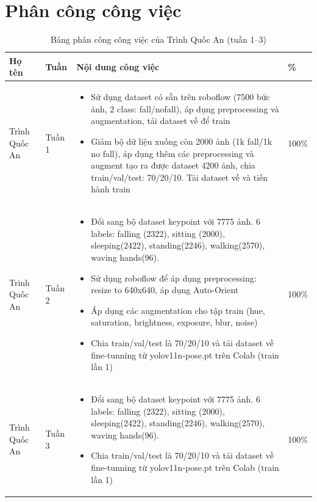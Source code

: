 \documentclass[12pt, a4paper]{article}
\begin{document}
\newpage
\appendix
\section{Phân công công việc}

\begin{table}[H]
  \centering
  \caption{Bảng phân công công việc của Trình Quốc An (tuần 1--3)}
  \label{tab:work_assignment_an_1}
  \renewcommand{\arraystretch}{1.2}
  \begin{tabularx}{\textwidth}{@{}p{3.6cm}p{1.4cm}X p{1.1cm}@{}}
    \toprule
    \textbf{Họ tên} & \textbf{Tuần} & \textbf{Nội dung công việc} & \textbf{\%} \\
    \midrule
    Trình Quốc An & Tuần 1 &
    \begin{itemize}[nosep, leftmargin=*]
      \item Sử dụng dataset có sẵn trên roboflow (7500 bức ảnh, 2 class: fall/nofall), áp dụng preprocessing và augmentation, tải dataset về để train
      \item Giảm bộ dữ liệu xuống còn 2000 ảnh (1k fall/1k no fall), áp dụng thêm các preprocessing và augment tạo ra được dataset 4200 ảnh, chia train/val/test: 70/20/10. Tải dataset về và tiến hành train
    \end{itemize}
    & 100\% \\
    \addlinespace
    Trình Quốc An & Tuần 2 &
    \begin{itemize}[nosep, leftmargin=*]
      \item Đổi sang bộ dataset keypoint với 7775 ảnh. 6 labels: falling (2322), sitting (2000), sleeping(2422), standing(2246), walking(2570), waving hands(96).
      \item Sử dụng roboflow để áp dụng preprocessing: resize to 640x640, áp dụng Auto-Orient
      \item Áp dụng các augmentation cho tập train (hue, saturation, brightness, exposure, blur, noise)
      \item Chia train/val/test là 70/20/10 và tải dataset về fine-tunning từ yolov11n-pose.pt trên Colab (train lần 1)
    \end{itemize}
    & 100\% \\
    \addlinespace
    Trình Quốc An & Tuần 3 &
    \begin{itemize}[nosep, leftmargin=*]
      \item Đổi sang bộ dataset keypoint với 7775 ảnh. 6 labels: falling (2322), sitting (2000), sleeping(2422), standing(2246), walking(2570), waving hands(96).
      \item Chia train/val/test là 70/20/10 và tải dataset về fine-tunning từ yolov11n-pose.pt trên Colab (train lần 1)
    \end{itemize}
    & 100\% \\
    \bottomrule
  \end{tabularx}
\end{table}
\end{document}
